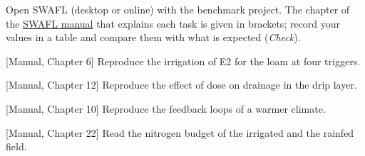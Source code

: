 {\small Open SWAFL (desktop or online) with the benchmark project. The chapter of the \href{https://github.com/halilunaziru73-creator/Coupled-Water-Fluxes-Pore-Scale-Dynamics-Precision-Irrigation-Mulching-Feedback-Loops/raw/main/Software/v1.1.0/SWAFL_Desktop/docs/manual_v1.1.0/SWAFL_Manual_v1.1.0.pdf}{SWAFL manual} that explains each task is given in brackets; record your values in a table and compare them with what is expected (\emph{Check}).}\par\vspace{3pt}
\begin{exlist}
\item {\color{khblue}[Manual, Chapter 6]} Reproduce the irrigation of E2 for the loam at four triggers.\par{}
\item {\color{khblue}[Manual, Chapter 12]} Reproduce the effect of dose on drainage in the drip layer.\par{}
\item {\color{khblue}[Manual, Chapter 10]} Reproduce the feedback loops of a warmer climate.\par{}
\item {\color{khblue}[Manual, Chapter 22]} Read the nitrogen budget of the irrigated and the rainfed field.\par{}
\end{exlist}
